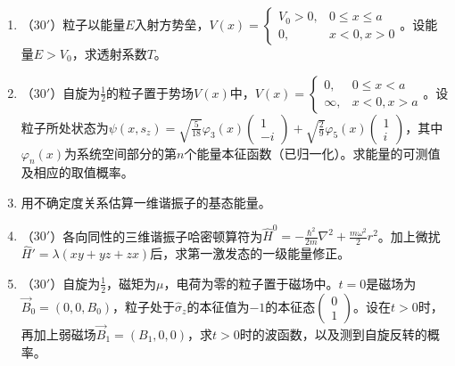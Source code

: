 


\begin{enumerate}
	\item
（$30'$）粒子以能量$E$入射方势垒，$V(x)=\begin{cases}V_0>0,&0\le x\le a\\0,&x<0,x>0\end{cases}$。设能量$E>V_0$，求透射系数$T$。

\banswer{
	
}


\item 
（$30'$）自旋为$\frac{1}{2}$的粒子置于势场$V(x)$中，$V(x)=\begin{cases}0,&0\le x<a\\ \infty,&x<0,x>a\end{cases}$。设粒子所处状态为$\psi(x,s_z)=\sqrt{\frac{5}{18}}\varphi_3(x)\begin{pmatrix}1\\-i\end{pmatrix}+\sqrt{\frac{2}{9}}\varphi_5(x)\begin{pmatrix}1\\ i\end{pmatrix}$，其中$\varphi_n(x)$为系统空间部分的第$n$个能量本征函数（已归一化）。求能量的可测值及相应的取值概率。


\banswer{
	
}


\item 
用不确定度关系估算一维谐振子的基态能量。
\banswer{
	
}


\newpage
\item 
（$30'$）各向同性的三维谐振子哈密顿算符为$\hat{H}^0=-\frac{\hbar^2}{2m}\nabla^2+\frac{m\omega^2}{2}r^2$。加上微扰$\hat{H}'=\lambda(xy+yz+zx)$后，求第一激发态的一级能量修正。

\banswer{
	
}


\item 
（$30'$）自旋为$\frac{1}{2}$，磁矩为$\mu$，电荷为零的粒子置于磁场中。$t=0$是磁场为$\vec{B}_0=(0,0,B_0)$，粒子处于$\hat{\sigma}_z$的本征值为$-1$的本征态$\begin{pmatrix}0\\1\end{pmatrix}$。设在$t>0$时，再加上弱磁场$\vec{B}_1=(B_1,0,0)$，求$t>0$时的波函数，以及测到自旋反转的概率。

\banswer{
	
}


	
\end{enumerate}
